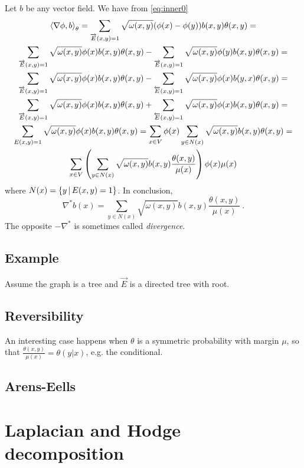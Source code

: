 \documentclass[12pt,a4paper]{amsart}
\begin{document}
Let $b$ be any vector field. We have from \cref{eq:inner0}
\begin{multline*}
  \left\langle\nabla \phi,b\right\rangle_{\theta} = \sum_{\overrightarrow E(x,y)=1}
  \sqrt{\omega(x,y)}  (\phi(x) - \phi(y)) b(x,y) \theta(x,y) = \\
  \sum_{\overrightarrow E(x,y)=1} \sqrt{\omega(x,y)} \phi(x) b(x,y)
  \theta(x,y) - \sum_{\overrightarrow E(x,y)=1}
  \sqrt{\omega(x,y)}  \phi(y) b(x,y) \theta(x,y) = \\
  \sum_{\overrightarrow E(x,y)=1} \sqrt{\omega(x,y)} \phi(x) b(x,y)
  \theta(x,y) - \sum_{\overleftarrow E(x,y)=1}
  \sqrt{\omega(x,y)}  \phi(x) b(y,x) \theta(x,y) = \\
  \sum_{\overrightarrow E(x,y)=1} \sqrt{\omega(x,y)} \phi(x) b(x,y)
  \theta(x,y) + \sum_{\overleftarrow E(x,y)=1}
  \sqrt{\omega(x,y)}  \phi(x) b(x,y) \theta(x,y) = \\
  \sum_{E(x,y)=1} \sqrt{\omega(x,y)}  \phi(x) b(x,y) \theta(x,y) = 
  \sum_{x \in V} \phi(x) \sum_{y \in N(x)}
  \sqrt{\omega(x,y)}  b(x,y) \theta(x,y) = \\
  \sum_{x \in V} \left(\sum_{y \in N(x)}
  \sqrt{\omega(x,y)}  b(x,y) \frac{\theta(x,y)}{\mu(x)} \right) \phi(x) \mu(x)
\end{multline*}
where $N(x) = \left\{y \, \middle| \, E(x,y)=1 \right\}$. In conclusion,
\begin{equation*}
  \nabla^* b(x) = \sum_{y \in N(x)}
  \sqrt{\omega(x,y)}  b(x,y) \frac{\theta(x,y)}{\mu(x)} \ .
\end{equation*}
The opposite $- \nabla^*$ is sometimes called \emph{divergence}.

\subsection*{Example} Assume the graph is a tree and $\overrightarrow E$ is a
directed tree with root.

\subsection*{Reversibility} An interesting case happens when $\theta$
is a symmetric probability with margin $\mu$, so that
$\frac{\theta(x,y)}{\mu(x)} = \theta(y | x)$, e.g. the conditional.

\subsection*{Arens-Eells}

\section{Laplacian and Hodge decomposition}
\label{sec:laplacian}
\end{document}
